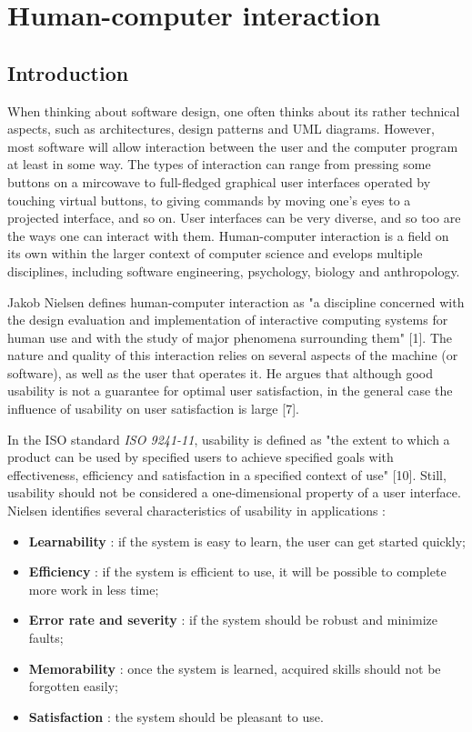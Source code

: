 \chapter{Human-computer interaction}\label{chapter:hci}

\section{Introduction}

When thinking about software design, one often thinks about its rather technical aspects, such as architectures, design patterns and UML diagrams. However, most software will allow interaction between the user and the computer program at least in some way. The types of interaction can range from pressing some buttons on a mircowave to full-fledged graphical user interfaces operated by touching virtual buttons, to giving commands by moving one's eyes to a projected interface, and so on. User interfaces can be very diverse, and so too are the ways one can interact with them. Human-computer interaction is a field on its own within the larger context of computer science and evelops multiple disciplines, including software engineering, psychology, biology and anthropology.

Jakob Nielsen defines human-computer interaction as "a discipline concerned with the design evaluation and implementation of interactive computing systems for human use and with the study of major phenomena surrounding them" [1]. The nature and quality of this interaction relies on several aspects of the machine (or software), as well as the user that operates it. He argues that although good usability is not a guarantee for optimal user satisfaction, in the general case the influence of usability on user satisfaction is large [7].

In the ISO standard \emph{ISO 9241-11}, usability is defined as "the extent to which a product can be used by specified users to achieve specified goals with effectiveness, efficiency and satisfaction in a specified context of use" [10]. Still, usability should not be considered a one-dimensional property of a user interface. Nielsen identifies several characteristics of usability in applications \cite{Nielsen:1993:UE:529793}:
\begin{itemize}
	\item \textbf{Learnability} : if the system is easy to learn, the user can get started quickly;
	\item \textbf{Efficiency} : if the system is efficient to use, it will be possible to complete more work in less time;
	\item\textbf{Error rate and severity} : if the system should be robust and minimize faults;
	\item \textbf{Memorability} : once the system is learned, acquired skills should not be forgotten easily;
	\item \textbf{Satisfaction} : the system should be pleasant to use.
\end{itemize}

